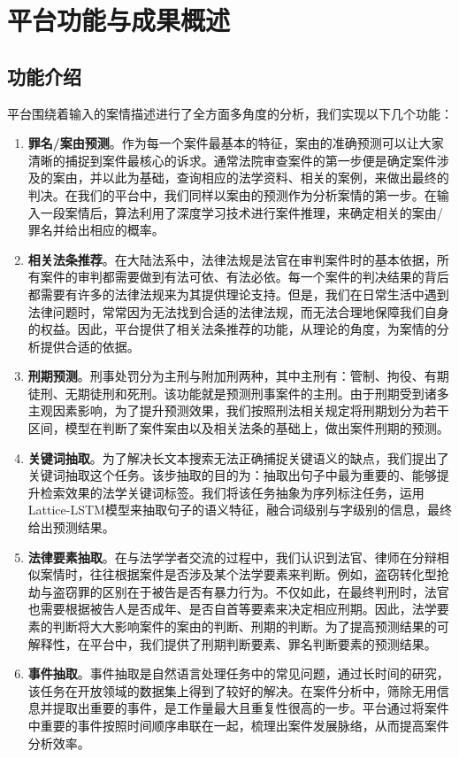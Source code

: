 
\chapter{平台功能与成果概述}

\section{功能介绍}
平台围绕着输入的案情描述进行了全方面多角度的分析，我们实现以下几个功能：
\begin{enumerate}[1)]
	\item \textbf{罪名/案由预测}。作为每一个案件最基本的特征，案由的准确预测可以让大家清晰的捕捉到案件最核心的诉求。通常法院审查案件的第一步便是确定案件涉及的案由，并以此为基础，查询相应的法学资料、相关的案例，来做出最终的判决。在我们的平台中，我们同样以案由的预测作为分析案情的第一步。在输入一段案情后，算法利用了深度学习技术进行案件推理，来确定相关的案由/罪名并给出相应的概率。
	\item \textbf{相关法条推荐}。在大陆法系中，法律法规是法官在审判案件时的基本依据，所有案件的审判都需要做到有法可依、有法必依。每一个案件的判决结果的背后都需要有许多的法律法规来为其提供理论支持。但是，我们在日常生活中遇到法律问题时，常常因为无法找到合适的法律法规，而无法合理地保障我们自身的权益。因此，平台提供了相关法条推荐的功能，从理论的角度，为案情的分析提供合适的依据。
	\item \textbf{刑期预测}。刑事处罚分为主刑与附加刑两种，其中主刑有：管制、拘役、有期徒刑、无期徒刑和死刑。该功能就是预测刑事案件的主刑。由于刑期受到诸多主观因素影响，为了提升预测效果，我们按照刑法相关规定将刑期划分为若干区间，模型在判断了案件案由以及相关法条的基础上，做出案件刑期的预测。
	\item \textbf{关键词抽取}。为了解决长文本搜索无法正确捕捉关键语义的缺点，我们提出了关键词抽取这个任务。该步抽取的目的为：抽取出句子中最为重要的、能够提升检索效果的法学关键词标签。我们将该任务抽象为序列标注任务，运用Lattice-LSTM模型来抽取句子的语义特征，融合词级别与字级别的信息，最终给出预测结果。
	\item \textbf{法律要素抽取}。在与法学学者交流的过程中，我们认识到法官、律师在分辩相似案情时，往往根据案件是否涉及某个法学要素来判断。例如，盗窃转化型抢劫与盗窃罪的区别在于被告是否有暴力行为。不仅如此，在最终判刑时，法官也需要根据被告人是否成年、是否自首等要素来决定相应刑期。因此，法学要素的判断将大大影响案件的案由的判断、刑期的判断。为了提高预测结果的可解释性，在平台中，我们提供了刑期判断要素、罪名判断要素的预测结果。
	\item \textbf{事件抽取}。事件抽取是自然语言处理任务中的常见问题，通过长时间的研究，该任务在开放领域的数据集上得到了较好的解决。在案件分析中，筛除无用信息并提取出重要的事件，是工作量最大且重复性很高的一步。平台通过将案件中重要的事件按照时间顺序串联在一起，梳理出案件发展脉络，从而提高案件分析效率。

\end{enumerate}

